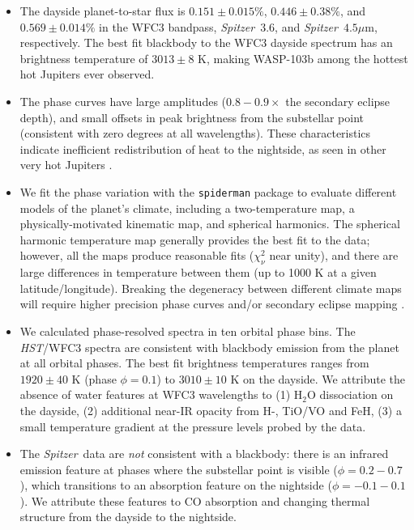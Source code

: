 \documentclass[twocolumn]{aastex61}
\newcommand{\project}[1]{\textsl{#1}}
\newcommand{\HST}{\project{HST}}
\newcommand{\Spitzer}{\project{Spitzer}}
\begin{document}
\begin{itemize}
	\item{The dayside planet-to-star flux is $0.151\pm0.015\%$, $0.446\pm0.38\%$, and $0.569\pm0.014\%$ in the WFC3 bandpass, \Spitzer\ $3.6$, and \Spitzer\ $4.5\mu$m, respectively.  The best fit blackbody to the WFC3 dayside spectrum has an brightness temperature of $3013 \pm 8$ K, making WASP-103b among the hottest hot Jupiters ever observed.}
	\item{The phase curves have large amplitudes ($0.8 -0.9\times$ the secondary eclipse depth), and small offsets in peak brightness from the substellar point (consistent with zero degrees at all wavelengths). These characteristics indicate inefficient redistribution of heat to the nightside, as seen in other very hot Jupiters \citep{komacek17}.}
	\item{We fit the phase variation with the \texttt{spiderman} package \citep{louden17} to evaluate different models of the planet's climate, including a two-temperature map, a physically-motivated kinematic map, and spherical harmonics. The spherical harmonic temperature map generally provides the best fit to the data; however, all the maps produce reasonable fits ($\chi^2_\nu$ near unity), and there are large differences in temperature between them (up to 1000 K at a given latitude/longitude). Breaking the degeneracy between different climate maps will require higher precision phase curves and/or secondary eclipse mapping \citep[e.g.][]{dewit12}.}
\item{We calculated phase-resolved spectra in ten orbital phase bins. The \HST/WFC3 spectra are consistent with  blackbody emission from the planet at all orbital phases. The best fit brightness temperatures ranges from $1920\pm40$ K (phase $\phi = 0.1$) to $3010\pm10$ K on the dayside. We attribute the absence of water features at WFC3 wavelengths to (1) H$_2$O dissociation on the dayside, (2) additional near-IR opacity from H-, TiO/VO and FeH, (3) a small temperature gradient at the pressure levels probed by the data.}
\item{The \Spitzer\ data are \emph{not} consistent with a blackbody: there is an infrared emission feature at phases where the substellar point is visible ($\phi = 0.2 - 0.7$), which transitions to an absorption feature on the nightside ($\phi = -0.1 - 0.1$). We attribute these features to CO absorption and changing thermal structure from the dayside to the nightside.}

\end{itemize}
\end{document}
